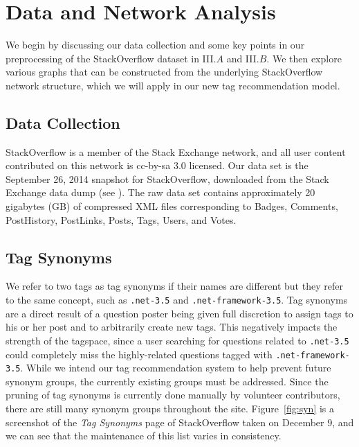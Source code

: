\documentclass[10pt]{IEEEtran}
\begin{document}
\section{Data and Network Analysis}

We begin by discussing our data collection and some key points in our preprocessing of the StackOverflow dataset in III.$A$ and III.$B$. We then explore various graphs that can be constructed from the underlying StackOverflow network structure, which we will apply in our new tag recommendation model.

\subsection{Data Collection}

StackOverflow is a member of the Stack Exchange network, and all user content contributed on this network is cc-by-sa 3.0 licensed. Our data set is the September 26, 2014 snapshot for StackOverflow, downloaded from the Stack Exchange data dump (see \cite{6}). The raw data set contains approximately 20 gigabytes (GB) of compressed XML files corresponding to Badges, Comments, PostHistory, PostLinks, Posts, Tags, Users, and Votes.

\subsection{Tag Synonyms}

We refer to two tags as tag synonyms if their names are different but they refer to the same concept, such as \texttt{.net-3.5} and \texttt{.net-framework-3.5}. Tag synonyms are a direct result of a question poster being given full discretion to assign tags to his or her post and to arbitrarily create new tags. This negatively impacts the strength of the tagspace, since a user searching for questions related to \texttt{.net-3.5} could completely miss the highly-related questions tagged with \texttt{.net-framework-3.5}. While we intend our tag recommendation system to help prevent future synonym groups, the currently existing groups must be addressed.  Since the pruning of tag synonyms is currently done manually by volunteer contributors, there are still many synonym groups throughout the site. Figure~\ref{fig:syn} is a screenshot of the \textit{Tag Synonyms} page of StackOverflow taken on December 9, and we can see that the maintenance of this list varies in consistency.\\
\end{document}
